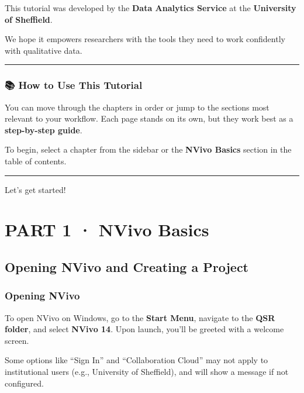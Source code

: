 \documentclass[
  letterpaper,
  DIV=11,
  numbers=noendperiod]{scrreprt}
\begin{document}
This tutorial was developed by the \textbf{Data Analytics Service} at
the \textbf{University of Sheffield}.

We hope it empowers researchers with the tools they need to work
confidently with qualitative data.

\begin{center}\rule{0.5\linewidth}{0.5pt}\end{center}

\section{📚 How to Use This Tutorial}\label{how-to-use-this-tutorial}

You can move through the chapters in order or jump to the sections most
relevant to your workflow. Each page stands on its own, but they work
best as a \textbf{step-by-step guide}.

To begin, select a chapter from the sidebar or the \textbf{NVivo Basics}
section in the table of contents.

\begin{center}\rule{0.5\linewidth}{0.5pt}\end{center}

Let's get started!

\part{PART 1 · NVivo Basics}

\chapter{Opening NVivo and Creating a
Project}\label{opening-nvivo-and-creating-a-project}

\section{Opening NVivo}\label{opening-nvivo}

To open NVivo on Windows, go to the \textbf{Start Menu}, navigate to the
\textbf{QSR folder}, and select \textbf{NVivo 14}. Upon launch, you'll
be greeted with a welcome screen.

\begin{tcolorbox}[enhanced jigsaw, breakable, left=2mm, colback=white, bottomrule=.15mm, colbacktitle=quarto-callout-note-color!10!white, leftrule=.75mm, title=\textcolor{quarto-callout-note-color}{\faInfo}\hspace{0.5em}{Note}, colframe=quarto-callout-note-color-frame, coltitle=black, toptitle=1mm, opacitybacktitle=0.6, toprule=.15mm, titlerule=0mm, bottomtitle=1mm, arc=.35mm, rightrule=.15mm, opacityback=0]

Some options like ``Sign In'' and ``Collaboration Cloud'' may not apply
to institutional users (e.g., University of Sheffield), and will show a
message if not configured.

\end{tcolorbox}
\end{document}
